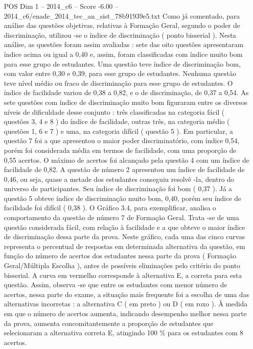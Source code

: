 \begin{textsample}{POS Dim 1 – 2014\_c6 – Score -6.00 – 2014\_c6/enade\_2014\_tec\_an\_sist\_78b91939e5.txt}
Como já comentado, para análise das questões objetivas, relativas à Formação Geral, segundo o poder de discriminação, utilizou -se o índice de discriminação ( ponto bisserial ).
Nesta análise, as questões foram assim avaliadas : sete das oito questões apresentaram índice acima ou igual a 0,40 e, assim, foram classificadas com índice muito bom para esse grupo de estudantes.
Uma questão teve índice de discriminação bom, com valor entre 0,30 e 0,39, para esse grupo de estudantes.
Nenhuma questão teve nível médio ou fraco de discriminação para esse grupo de estudantes.
O índice de facilidade variou de 0,38 a 0,82, e o de discriminação, de 0,37 a 0,54.
As sete questões com índice de discriminação muito bom figuraram entre os diversos níveis de dificuldade desse conjunto : três classificadas na categoria fácil ( questões 3, 4 e 8 ) do índice de facilidade, outras três, na categoria médio ( questões 1, 6 e 7 ) e uma, na categoria difícil ( questão 5 ).
Em particular, a questão 7 foi a que apresentou o maior poder discriminatório, com índice 0,54, porém foi considerada média em termos de facilidade, com uma proporção de 0,55 acertos.
O máximo de acertos foi alcançado pela questão 4 com um índice de facilidade de 0,82.
A questão de número 2 apresentou um índice de facilidade de 0,46, ou seja, quase a metade dos estudantes conseguiu resolvê -la, dentro do universo de participantes.
Seu índice de discriminação foi bom ( 0,37 ).
Já a questão 5 obteve índice de discriminação muito bom, 0,40, porém seu índice de facilidade foi difícil ( 0,38 ).
O Gráfico 3.4, para exemplificar, analisa o comportamento da questão de número 7 de Formação Geral.
Trata -se de uma questão considerada fácil, com relação à facilidade e a que obteve o maior índice de discriminação dessa parte da prova.
Neste gráfico, cada uma das cinco curvas representa o percentual de respostas em determinada alternativa da questão, em função do número de acertos dos estudantes nessa parte da prova ( Formação Geral/Múltipla Escolha ), antes de possíveis eliminações pelo critério do ponto bisserial.
A curva em vermelho corresponde à alternativa E, a correta para esta questão.
Assim, observa -se que entre os estudantes com menor número de acertos, nessa parte do exame, a situação mais frequente foi a escolha de uma das alternativas incorretas : a alternativa C ( em preto ) ou D ( em roxo ).
À medida em que o número de acertos aumenta, indicando desempenho melhor nessa parte da prova, aumenta concomitantemente a proporção de estudantes que selecionaram a alternativa correta E, atingindo 100 \% para os estudantes com 8 acertos.

\end{textsample}
